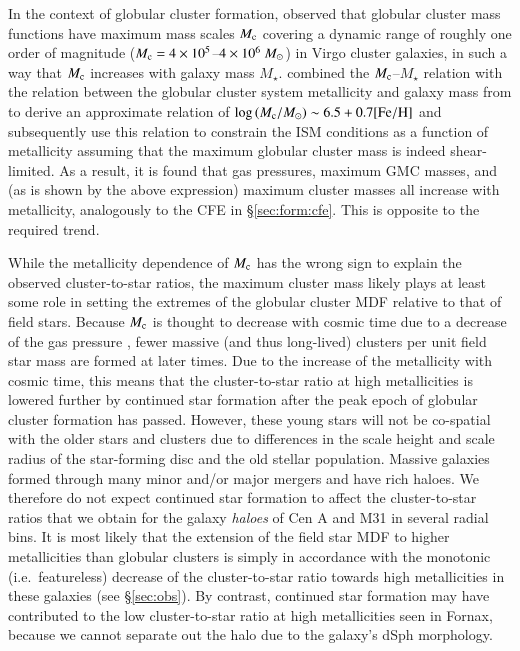 \documentclass{aa}
\begin{document}
In the context of globular cluster formation, \citet{jordan07} observed that globular cluster mass functions have maximum mass scales $M_{\rm c}$ covering a dynamic range of roughly one order of magnitude ($M_{\rm c}=4\times10^5$--$4\times10^6~\mbox{$M_{\odot}$}$) in Virgo cluster galaxies, in such a way that $M_{\rm c}$ increases with galaxy mass $M_\star$. \citet{kruijssen15b} combined the $M_{\rm c}$--$M_\star$ relation with the relation between the globular cluster system metallicity and galaxy mass from \citet{peng06} to derive an approximate relation of $\log{(M_{\rm c}/\mbox{$M_{\odot}$})}\sim6.5+0.7{\rm [Fe/H]}$ and subsequently use this relation to constrain the ISM conditions as a function of metallicity assuming that the maximum globular cluster mass is indeed shear-limited. As a result, it is found that gas pressures, maximum GMC masses, and (as is shown by the above expression) maximum cluster masses all increase with metallicity, analogously to the CFE in \S\ref{sec:form:cfe}. This is opposite to the required trend.

While the metallicity dependence of $M_{\rm c}$ has the wrong sign to explain the observed cluster-to-star ratios, the maximum cluster mass likely plays at least some role in setting the extremes of the globular cluster MDF relative to that of field stars. Because $M_{\rm c}$ is thought to decrease with cosmic time due to a decrease of the gas pressure \citep{reinacampos17}, fewer massive (and thus long-lived) clusters per unit field star mass are formed at later times. Due to the increase of the metallicity with cosmic time, this means that the cluster-to-star ratio at high metallicities is lowered further by continued star formation after the peak epoch of globular cluster formation has passed. However, these young stars will not be co-spatial with the older stars and clusters due to differences in the scale height and scale radius of the star-forming disc and the old stellar population. Massive galaxies formed through many minor and/or major mergers and have rich haloes. We therefore do not expect continued star formation to affect the cluster-to-star ratios that we obtain for the galaxy {\it haloes} of Cen A and M31 in several radial bins. It is most likely that the extension of the field star MDF to higher metallicities than globular clusters is simply in accordance with the monotonic (i.e.~featureless) decrease of the cluster-to-star ratio towards high metallicities in these galaxies (see \S\ref{sec:obs}). By contrast, continued star formation may have contributed to the low cluster-to-star ratio at high metallicities seen in Fornax, because we cannot separate out the halo due to the galaxy's dSph morphology.
\end{document}
